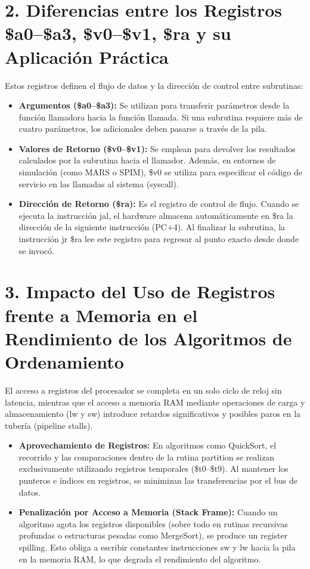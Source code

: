 \documentclass[12pt,a4paper]{article}
\begin{document}
\section*{2. Diferencias entre los Registros \$a0--\$a3, \$v0--\$v1, \$ra y su Aplicación Práctica}
Estos registros definen el flujo de datos y la dirección de control entre subrutinas:
\begin{itemize}
    \item \textbf{Argumentos (\$a0--\$a3):} Se utilizan para transferir parámetros desde la función llamadora hacia la función llamada. Si una subrutina requiere más de cuatro parámetros, los adicionales deben pasarse a través de la pila.
    \item \textbf{Valores de Retorno (\$v0--\$v1):} Se emplean para devolver los resultados calculados por la subrutina hacia el llamador. Además, en entornos de simulación (como MARS o SPIM), \$v0 se utiliza para especificar el código de servicio en las llamadas al sistema (syscall).
    \item \textbf{Dirección de Retorno (\$ra):} Es el registro de control de flujo. Cuando se ejecuta la instrucción jal, el hardware almacena automáticamente en \$ra la dirección de la siguiente instrucción (PC+4). Al finalizar la subrutina, la instrucción jr \$ra lee este registro para regresar al punto exacto desde donde se invocó.
\end{itemize}

\section*{3. Impacto del Uso de Registros frente a Memoria en el Rendimiento de los Algoritmos de Ordenamiento}
El acceso a registros del procesador se completa en un solo ciclo de reloj sin latencia, mientras que el acceso a memoria RAM mediante operaciones de carga y almacenamiento (lw y sw) introduce retardos significativos y posibles paros en la tubería (pipeline stalls).
\begin{itemize}
    \item \textbf{Aprovechamiento de Registros:} En algoritmos como QuickSort, el recorrido y las comparaciones dentro de la rutina partition se realizan exclusivamente utilizando registros temporales (\$t0--\$t9). Al mantener los punteros e índices en registros, se minimizan las transferencias por el bus de datos.
    \item \textbf{Penalización por Acceso a Memoria (Stack Frame):} Cuando un algoritmo agota los registros disponibles (sobre todo en rutinas recursivas profundas o estructuras pesadas como MergeSort), se produce un register spilling. Esto obliga a escribir constantes instrucciones sw y lw hacia la pila en la memoria RAM, lo que degrada el rendimiento del algoritmo.
\end{itemize}
\end{document}

